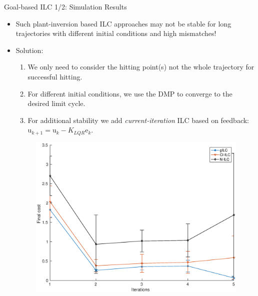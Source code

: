 \documentclass[handout]{beamer}
\newcommand{\boldvec}[1]{\boldsymbol{\mathrm{#1}}}
\let\vec\boldvec
\newcommand{\error}{\vec{e}} %
\newcommand{\sysInput}{\vec{u}} %
\begin{document}
\begin{frame}{Goal-based ILC 1/2: Simulation Results}
\begin{itemize}
\item Such plant-inversion based ILC approaches may not be stable for long trajectories with different initial conditions and high mismatches!
\item Solution:
\begin{enumerate}
\item We only need to consider the hitting point(s) not the whole trajectory for successful hitting.
\item For different initial conditions, we use the DMP to converge to the desired limit cycle.
\item For additional stability we add \emph{current-iteration} ILC based on feedback: $\sysInput_{k+1} = \sysInput_{k} - K_{LQR}\error_{k}$.
\end{enumerate}
\begin{figure}
\center
\includegraphics[scale=0.20]{ilcForWAM.eps}			
\end{figure}
\end{itemize}
\end{frame}
%
\end{document}
